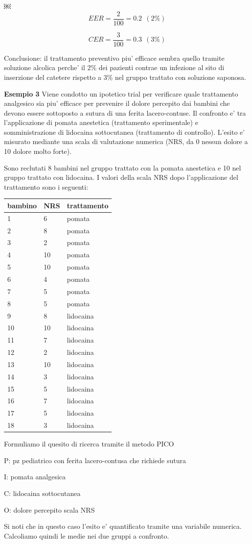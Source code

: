 \documentclass[]{book}
\begin{document}
￼
\[EER = \frac{2}{100} = 0.2 \ \ (2\%)\]

\[CER = \frac{3}{100} = 0.3 \ \ (3\%)\]

Conclusione: il trattamento preventivo piu' efficace sembra quello tramite soluzione alcolica perche' il 2\% dei pazienti contrae un infezione al sito di inserzione del catetere rispetto a 3\% nel gruppo trattato con soluzione saponosa.

\textbf{Esempio 3}
Viene condotto un ipotetico trial per verificare quale trattamento analgesico sia piu' efficace per prevenire il dolore percepito dai bambini che devono essere sottoposto a sutura di una ferita lacero-contuse.
Il confronto e' tra l'applicazione di pomata anestetica (trattamento sperimentale) e somministrazione di lidocaina sottocutanea (trattamento di controllo). L'esito e' misurato mediante una scala di valutazione numerica (NRS, da 0 nessun dolore a 10 dolore molto forte).

Sono reclutati 8 bambini nel gruppo trattato con la pomata anestetica e 10 nel gruppo trattato con lidocaina. I valori della scala NRS dopo l'applicazione del trattamento sono i seguenti:

\begin{longtable}[]{@{}lll@{}}
\toprule
bambino & NRS & trattamento\tabularnewline
\midrule
\endhead
1 & 6 & pomata\tabularnewline
2 & 8 & pomata\tabularnewline
3 & 2 & pomata\tabularnewline
4 & 10 & pomata\tabularnewline
5 & 10 & pomata\tabularnewline
6 & 4 & pomata\tabularnewline
7 & 5 & pomata\tabularnewline
8 & 5 & pomata\tabularnewline
9 & 8 & lidocaina\tabularnewline
10 & 10 & lidocaina\tabularnewline
11 & 7 & lidocaina\tabularnewline
12 & 2 & lidocaina\tabularnewline
13 & 10 & lidocaina\tabularnewline
14 & 3 & lidocaina\tabularnewline
15 & 5 & lidocaina\tabularnewline
16 & 7 & lidocaina\tabularnewline
17 & 5 & lidocaina\tabularnewline
18 & 3 & lidocaina\tabularnewline
\bottomrule
\end{longtable}

Formuliamo il quesito di ricerca tramite il metodo PICO

P: pz pediatrico con ferita lacero-contusa che richiede sutura

I: pomata analgesica

C: lidocaina sottocutanea

O: dolore percepito scala NRS

Si noti che in questo caso l'esito e' quantificato tramite una variabile numerica. Calcoliamo quindi le medie nei due gruppi a confronto.
\end{document}
